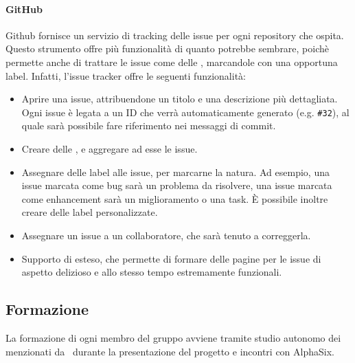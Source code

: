     		\paragraph{GitHub}\label{Github}
			Github fornisce un servizio di tracking delle issue per ogni repository che ospita. Questo strumento offre più funzionalità di quanto potrebbe
			sembrare, poichè permette anche di trattare le issue come delle , marcandole con una opportuna label. Infatti, l'issue tracker offre le seguenti
			funzionalità:
			\begin{itemize}
				\item Aprire una issue, attribuendone un titolo e una descrizione più dettagliata. Ogni issue è legata a un ID che verrà automaticamente generato (e.g. \texttt{\#32}),
					al quale sarà possibile fare riferimento nei messaggi di commit.
				\item Creare delle , e aggregare ad esse le issue.
				\item Assegnare delle label alle issue, per marcarne la natura. Ad esempio, una issue marcata come bug sarà un problema da risolvere,
					una issue marcata come enhancement sarà un miglioramento o una task. È possibile inoltre creare delle label personalizzate.
				\item Assegnare un issue a un collaboratore, che sarà tenuto a correggerla.
				\item Supporto di  esteso, che permette di formare delle pagine per le issue di aspetto delizioso e allo stesso tempo estremamente funzionali.
			\end{itemize}




	\subsection{Formazione}

		La formazione di ogni membro del gruppo avviene tramite studio autonomo dei  menzionati da \II\ durante la presentazione del progetto e incontri con AlphaSix.

